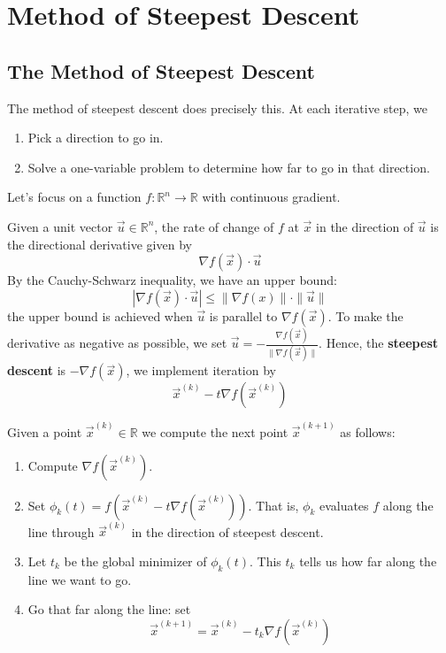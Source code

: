 \documentclass[11pt]{elegantbook}
\begin{document}
\section{Method of Steepest Descent}
\subsection{The Method of Steepest Descent}
The method of steepest descent does precisely this. At each iterative step, we
\begin{enumerate}
    \item Pick a direction to go in.
    \item Solve a one-variable problem to determine how far to go in that direction.
\end{enumerate}
Let's focus on a function $f: \mathbb{R}^n \rightarrow  \mathbb{R}$ with continuous gradient.

Given a unit vector $\vec{u}\in \mathbb{R}^n$, the rate of change of $f$ at $\vec{x}$ in the direction of $\vec{u}$ is the directional derivative given by
$$\nabla f(\vec{x})\cdot \vec{u}$$
By the Cauchy-Schwarz inequality, we have an upper bound: $$|\nabla f(\vec{x})\cdot \vec{u}|\leq \|\nabla f(x)\|\cdot\|\vec{u}\|$$
the upper bound is achieved when $\vec{u}$ is parallel to $\nabla f(\vec{x})$. To make the derivative as negative as possible, we set $\vec{u}=-\frac{\nabla f(\vec{x})}{\|\nabla f(\vec{x})\|}$.
Hence, the \textbf{steepest descent} is $-\nabla f(\vec{x})$, we implement iteration by $$\vec{x}^{(k)}-t \nabla f(\vec{x}^{(k)})$$

\begin{definition}
Given a point $\vec{x}^{(k)}\in \mathbb{R}$ we compute the next point $\vec{x}^{(k+1)}$ as follows:
\begin{enumerate}
    \item Compute $\nabla f(\vec{x}^{(k)})$.
    \item Set $\phi_k(t)=f(\vec{x}^{(k)}-t \nabla f(\vec{x}^{(k)}))$. That is, $\phi_k$ evaluates $f$ along the line through $\vec{x}^{(k)}$ in the direction of steepest descent.
    \item Let $t_k$ be the global minimizer of $\phi_k(t)$. This $t_k$ tells us how far along the line we want to go.
    \item Go that far along the line: set $$\vec{x}^{(k+1)}=\vec{x}^{(k)}-t_k \nabla f(\vec{x}^{(k)})$$
\end{enumerate}
\end{definition}
\end{document}
